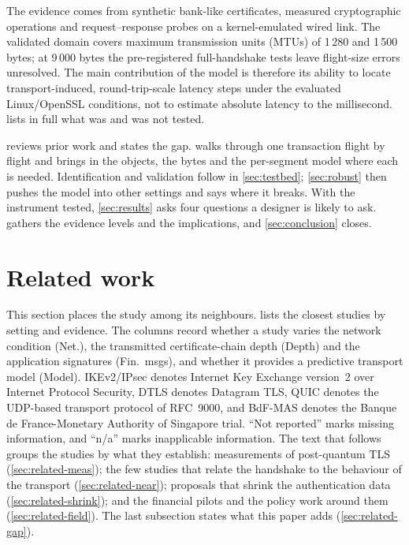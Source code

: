 \documentclass[preprint,12pt]{elsarticle}
\begin{document}
The evidence comes from synthetic bank-like certificates, measured cryptographic operations and request--response probes on a kernel-emulated wired link. The validated domain covers maximum transmission units (MTUs) of 1\,280 and 1\,500 bytes; at 9\,000 bytes the pre-registered full-handshake tests leave flight-size errors unresolved. The main contribution of the model is therefore its ability to locate transport-induced, round-trip-scale latency steps under the evaluated Linux/OpenSSL conditions, not to estimate absolute latency to the millisecond.  lists in full what was and was not tested.

 reviews prior work and states the gap.  walks through one transaction flight by flight and brings in the objects, the bytes and the per-segment model where each is needed. Identification and validation follow in \cref{sec:testbed}; \cref{sec:robust} then pushes the model into other settings and says where it breaks. With the instrument tested, \cref{sec:results} asks four questions a designer is likely to ask.  gathers the evidence levels and the implications, and \cref{sec:conclusion} closes.


\section{Related work}
\label{sec:related}
This section places the study among its neighbours.  lists the closest studies by setting and evidence. The columns record whether a study varies the network condition (Net.), the transmitted certificate-chain depth (Depth) and the application signatures (Fin.\ msgs), and whether it provides a predictive transport model (Model). IKEv2/IPsec denotes Internet Key Exchange version~2 over Internet Protocol Security, DTLS denotes Datagram TLS, QUIC denotes the UDP-based transport protocol of RFC~9000, and BdF-MAS denotes the Banque de France-Monetary Authority of Singapore trial. ``Not reported'' marks missing information, and ``n/a'' marks inapplicable information. The text that follows groups the studies by what they establish: measurements of post-quantum TLS (\cref{sec:related-meas}); the few studies that relate the handshake to the behaviour of the transport (\cref{sec:related-near}); proposals that shrink the authentication data (\cref{sec:related-shrink}); and the financial pilots and the policy work around them (\cref{sec:related-field}). The last subsection states what this paper adds (\cref{sec:related-gap}).
\end{document}
